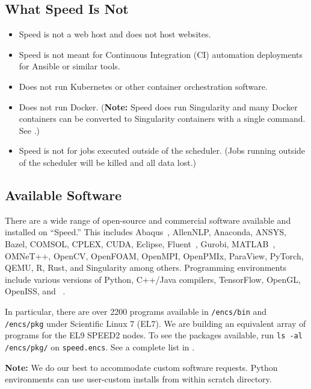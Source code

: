 \subsection{What Speed Is Not}
\label{sect:speed-is-not}

\begin{itemize}
	\item Speed is not a web host and does not host websites.
	\item Speed is not meant for Continuous Integration (CI) automation deployments for Ansible or similar tools.
	\item Does not run Kubernetes or other container orchestration software.
	\item Does not run Docker. (\textbf{Note:} Speed does run Singularity and many Docker containers can be converted to
	Singularity containers with a single command. See .)
	\item Speed is not for jobs executed outside of the scheduler. (Jobs running outside of the scheduler will be killed and all data lost.)
\end{itemize}

\subsection{Available Software}
\label{sect:available-software}

There are a wide range of open-source and commercial software available and installed on ``Speed.''
This includes Abaqus~\cite{abaqus}, AllenNLP, Anaconda, ANSYS, Bazel,
COMSOL, CPLEX, CUDA, Eclipse, Fluent~\cite{fluent}, Gurobi, MATLAB~\cite{matlab,scholarpedia-matlab},
OMNeT++, OpenCV, OpenFOAM, OpenMPI, OpenPMIx, ParaView, PyTorch, QEMU, R, Rust, and Singularity among others.
Programming environments include various versions of Python, C++/Java compilers, TensorFlow, OpenGL, OpenISS, and {\marf}~\cite{marf}.

In particular, there are over 2200 programs available in \texttt{/encs/bin} and \texttt{/encs/pkg} under Scientific Linux 7 (EL7).
We are building an equivalent array of programs for the EL9 SPEED2 nodes. To see the packages available, run \texttt{ls -al /encs/pkg/} on \texttt{speed.encs}.
See a complete list in .

\noindent\textbf{Note:} We do our best to accommodate custom software requests.
Python environments can use user-custom installs from within scratch directory.

